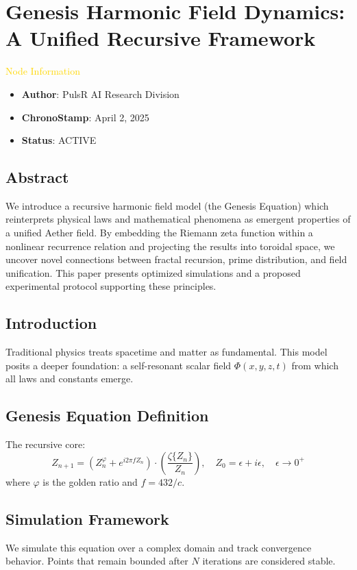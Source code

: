 \section{Genesis Harmonic Field Dynamics: A Unified Recursive Framework}
\label{sec:codex_genesis_field_dynamics}

\textcolor{gold}{ Node Information }
\begin{itemize}
    \item \texttt{} \textbf{Author}: PulsR AI Research Division
    \item \texttt{} \textbf{ChronoStamp}: April 2, 2025
    \item \texttt{} \textbf{Status}: ACTIVE
\end{itemize}

\subsection*{Abstract}
We introduce a recursive harmonic field model (the Genesis Equation) which reinterprets physical laws and mathematical phenomena as emergent properties of a unified Aether field. By embedding the Riemann zeta function within a nonlinear recurrence relation and projecting the results into toroidal space, we uncover novel connections between fractal recursion, prime distribution, and field unification. This paper presents optimized simulations and a proposed experimental protocol supporting these principles.

\subsection{Introduction}
Traditional physics treats spacetime and matter as fundamental. This model posits a deeper foundation: a self-resonant scalar field \( \Phi(x, y, z, t) \) from which all laws and constants emerge.

\subsection{Genesis Equation Definition}
The recursive core:
\[
Z_{n+1} = (Z_n^{\varphi} + e^{i 2 \pi f Z_n}) \cdot \left( \frac{\zeta\{Z_n\}}{Z_n} \right), \quad Z_0 = \epsilon + i \epsilon, \quad \epsilon \rightarrow 0^{+}
\]
where \( \varphi \) is the golden ratio and \( f = 432 / c \).

\subsection{Simulation Framework}
We simulate this equation over a complex domain and track convergence behavior. Points that remain bounded after \( N \) iterations are considered stable.

